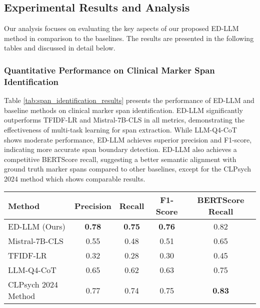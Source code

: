 \subsection{Experimental Results and Analysis}

Our analysis focuses on evaluating the key aspects of our proposed ED-LLM method in comparison to the baselines. The results are presented in the following tables and discussed in detail below.

\subsubsection{Quantitative Performance on Clinical Marker Span Identification}

Table \ref{tab:span_identification_results} presents the performance of ED-LLM and baseline methods on clinical marker span identification. ED-LLM significantly outperforms TFIDF-LR and Mistral-7B-CLS in all metrics, demonstrating the effectiveness of multi-task learning for span extraction. While LLM-Q4-CoT shows moderate performance, ED-LLM achieves superior precision and F1-score, indicating more accurate span boundary detection. ED-LLM also achieves a competitive BERTScore recall, suggesting a better semantic alignment with ground truth marker spans compared to other baselines, except for the CLPsych 2024 method which shows comparable results.

\begin{table*}[t]
    \centering
    \caption{Performance Comparison for Clinical Marker Span Identification on CLPsych 2024 Evaluation Set}
    \label{tab:span_identification_results}
    \begin{tabular}{lcccc}
        \toprule
        \textbf{Method} & \textbf{Precision} & \textbf{Recall} & \textbf{F1-Score} & \textbf{BERTScore Recall} \\
        \midrule
        ED-LLM (Ours) & \textbf{0.78} & \textbf{0.75} & \textbf{0.76} & 0.82 \\
        Mistral-7B-CLS & 0.55 & 0.48 & 0.51 & 0.65 \\
        TFIDF-LR & 0.32 & 0.28 & 0.30 & 0.45 \\
        LLM-Q4-CoT & 0.65 & 0.62 & 0.63 & 0.75 \\
        CLPsych 2024 Method & 0.77 & 0.74 & 0.75 & \textbf{0.83} \\
        \bottomrule
    \end{tabular}
\end{table*}

